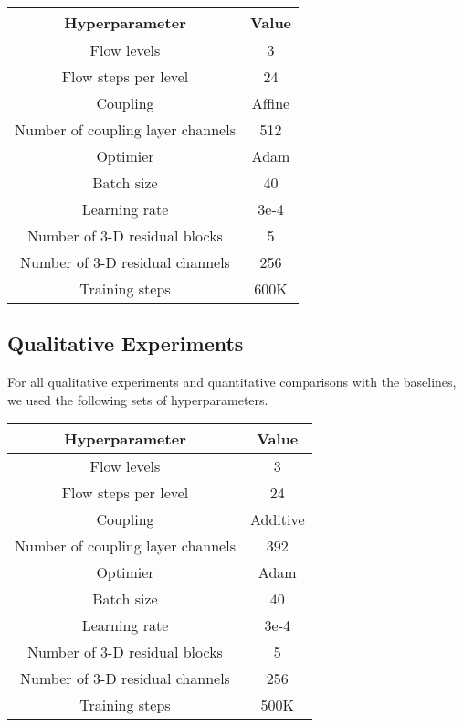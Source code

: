 \documentclass{article} \usepackage{iclr2020_conference,times}
\begin{document}
\begin{center}
\begin{tabular}{ |c|c| } 
 \hline
 \textbf{Hyperparameter} & \textbf{Value} \\
 \hline
 Flow levels & 3 \\
 \hline
 Flow steps per level & 24 \\
 \hline
 Coupling & Affine \\
 \hline
 Number of coupling layer channels & 512 \\
 \hline
 Optimier & Adam \\
 \hline
 Batch size & 40 \\
 \hline
 Learning rate & 3e-4 \\
 \hline
 Number of 3-D residual blocks & 5 \\
 \hline
 Number of 3-D residual channels & 256 \\
 \hline
 Training steps & 600K \\
 \hline
\end{tabular}
\end{center}

\subsection{Qualitative Experiments}

For all qualitative experiments and quantitative comparisons with the baselines, we used the following sets of hyperparameters.

\begin{center}
\begin{tabular}{ |c|c| } 
 \hline
 \textbf{Hyperparameter} & \textbf{Value} \\
 \hline
 Flow levels & 3 \\
 \hline
 Flow steps per level & 24 \\
 \hline
 Coupling & Additive \\
 \hline
 Number of coupling layer channels & 392 \\
 \hline
 Optimier & Adam \\
 \hline
 Batch size & 40 \\
 \hline
 Learning rate & 3e-4 \\
 \hline
 Number of 3-D residual blocks & 5 \\
 \hline
 Number of 3-D residual channels & 256 \\
 \hline
 Training steps & 500K \\
 \hline
\end{tabular}
\end{center}
\end{document}
